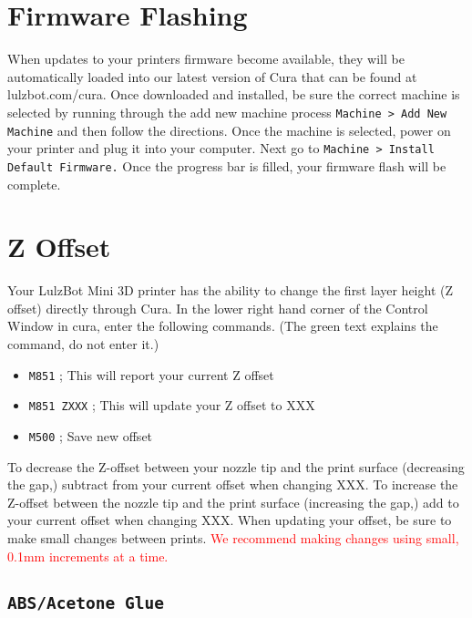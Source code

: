 
\section{Firmware Flashing}
\label{ssec:num2}
When updates to your printers firmware become available, they will be automatically loaded into our latest version of Cura that can be found at lulzbot.com/cura. Once downloaded and installed, be sure the correct machine is selected by running through the add new machine process \texttt{Machine > Add New Machine} and then follow the directions. Once the machine is selected, power on your printer and plug it into your computer. Next go to \texttt{Machine > Install Default Firmware.} Once the progress bar is filled, your firmware flash will be complete.

\section{Z Offset}
\label{ssec:Z Offset}
Your LulzBot Mini 3D printer has the ability to change the first layer height (Z offset) directly through Cura. In the lower right hand corner of the Control Window in cura, enter the following commands. (The green text explains the command, do not enter it.)
\begin{itemize}
\item \texttt{M851}                    \textcolor{green2}{; This will report your current Z offset}
\item \texttt{M851 ZXXX}                    \textcolor{green2}{; This will update your Z offset to XXX}
\item \texttt{M500}                    \textcolor{green2}{; Save new offset}
\end{itemize}

To decrease the Z-offset between your nozzle tip and the print surface (decreasing the gap,) subtract from your current offset when changing XXX. To increase the Z-offset between the nozzle tip and the print surface (increasing the gap,) add to your current offset when changing XXX. When updating your offset, be sure to make small changes between prints. \textcolor{red}{We recommend making changes using small, 0.1mm increments at a time.} 

\subsection{\texttt{ABS/Acetone Glue}}
\label{sec:ABS/Acetone Glue}

